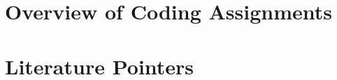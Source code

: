 
\clearpage
\renewcommand{\exsection}[1]{\subsection{#1}}
\renewcommand{\exsubsection}[1]{\subsubsection{#1}}
\renewcommand{\tableofcontents}{}

\section{Overview of Coding Assignments}


\section{Literature Pointers}




\clearpage
{}
{}
\printindex



